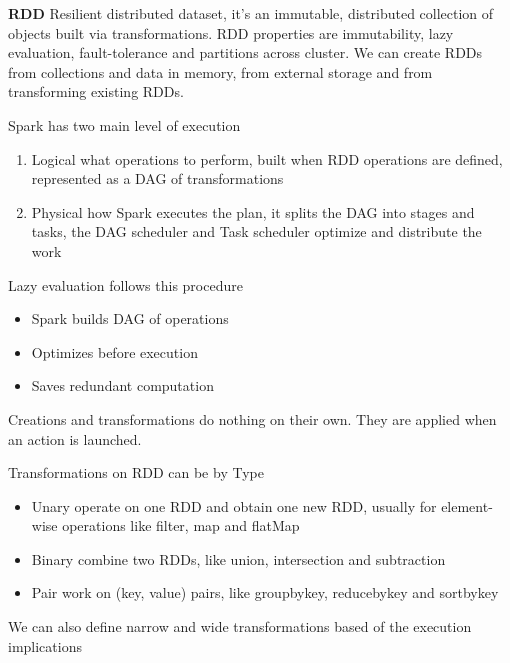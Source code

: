 \vspace{10pt}

\textbf{RDD} \ra Resilient distributed dataset, it's an immutable, distributed collection of objects built via transformations. RDD properties are immutability, lazy evaluation, fault-tolerance and partitions across cluster. We can create RDDs from collections and data in memory, from external storage and from transforming existing RDDs.

\vspace{10pt}

Spark has two main level of execution

\begin{enumerate}
    \item Logical \ra what operations to perform, built when RDD operations are defined, represented as a DAG of transformations
    \item Physical \ra how Spark executes the plan, it splits the DAG into stages and tasks, the DAG scheduler and Task scheduler optimize and distribute the work
\end{enumerate}


\vspace{10pt}

Lazy evaluation follows this procedure

\begin{itemize}
    \item Spark builds DAG of operations
    \item Optimizes before execution
    \item Saves redundant computation
\end{itemize}

Creations and transformations do nothing on their own. They are applied when an action is launched. 

\vspace{10pt}

Transformations on RDD can be by Type
\begin{itemize}
    \item Unary \ra operate on one RDD and obtain one new RDD, usually for element-wise operations like filter, map and flatMap
    \item Binary \ra combine two RDDs, like union, intersection and subtraction
    \item Pair \ra work on (key, value) pairs, like groupbykey, reducebykey and sortbykey
\end{itemize}

We can also define narrow and wide transformations based of the execution implications

